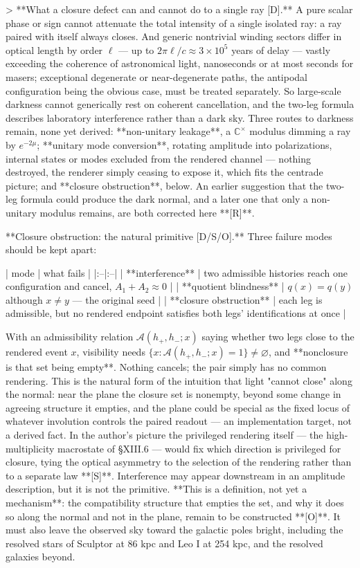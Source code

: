 > **What a closure defect can and cannot do to a single ray [D].** A pure scalar phase or sign cannot attenuate the total intensity of a single isolated ray: a ray paired with itself always closes. And generic nontrivial winding sectors differ in optical length by order $\ell$ — up to $2\pi\ell/c\approx3\times10^5$ years of delay — vastly exceeding the coherence of astronomical light, nanoseconds or at most seconds for masers; exceptional degenerate or near-degenerate paths, the antipodal configuration being the obvious case, must be treated separately. So large-scale darkness cannot generically rest on coherent cancellation, and the two-leg formula describes laboratory interference rather than a dark sky. Three routes to darkness remain, none yet derived: **non-unitary leakage**, a $\mathbb{C}^\times$ modulus dimming a ray by $e^{-2\mu}$; **unitary mode conversion**, rotating amplitude into polarizations, internal states or modes excluded from the rendered channel — nothing destroyed, the renderer simply ceasing to expose it, which fits the centrade picture; and **closure obstruction**, below. An earlier suggestion that the two-leg formula could produce the dark normal, and a later one that only a non-unitary modulus remains, are both corrected here **[R]**.

**Closure obstruction: the natural primitive [D/S/O].** Three failure modes should be kept apart:

| mode | what fails |
|:--|:--|
| **interference** | two admissible histories reach one configuration and cancel, $A_1+A_2\approx0$ |
| **quotient blindness** | $q(x) = q(y)$ although $x\neq y$ — the original seed |
| **closure obstruction** | each leg is admissible, but no rendered endpoint satisfies both legs' identifications at once |

With an admissibility relation $\mathcal A(h_+,h_-;x)$ saying whether two legs close to the rendered event $x$, visibility needs $\{x:\mathcal A(h_+,h_-;x) = 1\}\neq\varnothing$, and **nonclosure is that set being empty**. Nothing cancels; the pair simply has no common rendering. This is the natural form of the intuition that light "cannot close" along the normal: near the plane the closure set is nonempty, beyond some change in agreeing structure it empties, and the plane could be special as the fixed locus of whatever involution controls the paired readout — an implementation target, not a derived fact. In the author's picture the privileged rendering itself — the high-multiplicity macrostate of §XIII.6 — would fix which direction is privileged for closure, tying the optical asymmetry to the selection of the rendering rather than to a separate law **[S]**. Interference may appear downstream in an amplitude description, but it is not the primitive. **This is a definition, not yet a mechanism**: the compatibility structure that empties the set, and why it does so along the normal and not in the plane, remain to be constructed **[O]**. It must also leave the observed sky toward the galactic poles bright, including the resolved stars of Sculptor at 86 kpc and Leo I at 254 kpc, and the resolved galaxies beyond.

